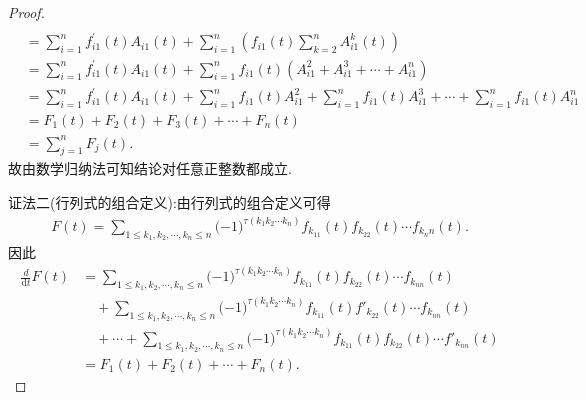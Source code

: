 \documentclass[../../main.tex]{subfiles}
\begin{document}
\begin{proof}
\begin{align*}
\\
&=\sum_{i=1}^n{f_{i1}^{\prime}\left( t \right) A_{i1}\left( t \right)}+\sum_{i=1}^n{\left( f_{i1}\left( t \right) \sum_{k=2}^n{A_{i1}^{k}\left( t \right)} \right)}
\\
&=\sum_{i=1}^n{f_{i1}^{\prime}\left( t \right) A_{i1}\left( t \right)}+\sum_{i=1}^n{f_{i1}\left( t \right) \left( A_{i1}^{2}+A_{i1}^{3}+\cdots +A_{i1}^{n} \right)}
\\
&=\sum_{i=1}^n{f_{i1}^{\prime}\left( t \right) A_{i1}\left( t \right)}+\sum_{i=1}^n{f_{i1}\left( t \right) A_{i1}^{2}}+\sum_{i=1}^n{f_{i1}\left( t \right) A_{i1}^{3}}+\cdots +\sum_{i=1}^n{f_{i1}\left( t \right) A_{i1}^{n}}
\\
&=F_1\left( t \right) +F_2\left( t \right) +F_3\left( t \right) +\cdots +F_n\left( t \right) 
\\
&=\sum_{j=1}^n{F_j\left( t \right)}.
\end{align*}
故由数学归纳法可知结论对任意正整数都成立.

{\color{blue}证法二(行列式的组合定义):}由行列式的组合定义可得
\begin{align*}
F(t)=\sum_{1\le k_1,k_2,\cdots ,k_n\le n}{(}-1)^{\tau (k_1k_2\cdots k_n)}f_{k_11}(t)f_{k_22}(t)\cdots f_{k_nn}(t).
\end{align*}
因此
\begin{align*}
\frac{d}{\mathrm{d}t}F(t)&=\sum_{1\le k_1,k_2,\cdots ,k_n\le n}{(}-1)^{\tau (k_1k_2\cdots k_n)}f_{k_{11}}(t)f_{k_{22}}(t)\cdots f_{k_{nn}}(t)
\\
&\quad+\sum_{1\le k_1,k_2,\cdots ,k_n\le n}{(}-1)^{\tau (k_1k_2\cdots k_n)}f_{k_{11}}(t)f\prime_{k_{22}}(t)\cdots f_{k_{nn}}(t)
\\
&\quad+\cdots +\sum_{1\le k_1,k_2,\cdots ,k_n\le n}{(}-1)^{\tau (k_1k_2\cdots k_n)}f_{k_{11}}(t)f_{k_{22}}(t)\cdots f\prime_{k_{nn}}(t)
\\
&=F_1(t)+F_2(t)+\cdots +F_n(t).
\end{align*}

\end{proof}
\end{document}
